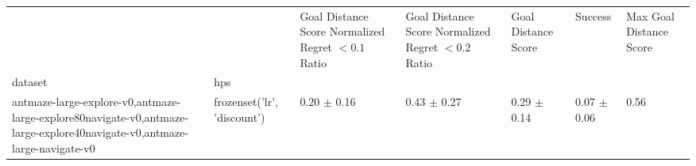\begin{tabular}{lllllll}
\toprule
 &  & Goal Distance Score Normalized Regret $< 0.1$ Ratio & Goal Distance Score Normalized Regret $< 0.2$ Ratio & Goal Distance Score & Success & Max Goal Distance Score \\
dataset & hps &  &  &  &  &  \\
\midrule
antmaze-large-explore-v0,antmaze-large-explore80navigate-v0,antmaze-large-explore40navigate-v0,antmaze-large-navigate-v0 & frozenset({'lr', 'discount'}) & 0.20 $\pm$ 0.16 & 0.43 $\pm$ 0.27 & 0.29 $\pm$ 0.14 & 0.07 $\pm$ 0.06 & 0.56 \\
\cline{1-7}
\bottomrule
\end{tabular}
